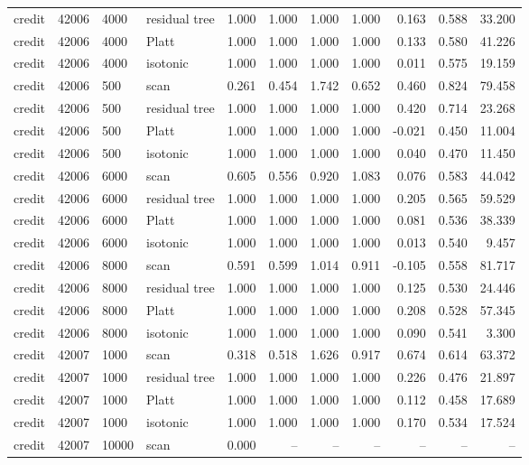 \begin{tabular}{lrllrrrrrrr}
credit & 42006 & 4000 & residual tree & 1.000 & 1.000 & 1.000 & 1.000 & 0.163 & 0.588 & 33.200 \\
credit & 42006 & 4000 & Platt & 1.000 & 1.000 & 1.000 & 1.000 & 0.133 & 0.580 & 41.226 \\
credit & 42006 & 4000 & isotonic & 1.000 & 1.000 & 1.000 & 1.000 & 0.011 & 0.575 & 19.159 \\
credit & 42006 & 500 & scan & 0.261 & 0.454 & 1.742 & 0.652 & 0.460 & 0.824 & 79.458 \\
credit & 42006 & 500 & residual tree & 1.000 & 1.000 & 1.000 & 1.000 & 0.420 & 0.714 & 23.268 \\
credit & 42006 & 500 & Platt & 1.000 & 1.000 & 1.000 & 1.000 & -0.021 & 0.450 & 11.004 \\
credit & 42006 & 500 & isotonic & 1.000 & 1.000 & 1.000 & 1.000 & 0.040 & 0.470 & 11.450 \\
credit & 42006 & 6000 & scan & 0.605 & 0.556 & 0.920 & 1.083 & 0.076 & 0.583 & 44.042 \\
credit & 42006 & 6000 & residual tree & 1.000 & 1.000 & 1.000 & 1.000 & 0.205 & 0.565 & 59.529 \\
credit & 42006 & 6000 & Platt & 1.000 & 1.000 & 1.000 & 1.000 & 0.081 & 0.536 & 38.339 \\
credit & 42006 & 6000 & isotonic & 1.000 & 1.000 & 1.000 & 1.000 & 0.013 & 0.540 & 9.457 \\
credit & 42006 & 8000 & scan & 0.591 & 0.599 & 1.014 & 0.911 & -0.105 & 0.558 & 81.717 \\
credit & 42006 & 8000 & residual tree & 1.000 & 1.000 & 1.000 & 1.000 & 0.125 & 0.530 & 24.446 \\
credit & 42006 & 8000 & Platt & 1.000 & 1.000 & 1.000 & 1.000 & 0.208 & 0.528 & 57.345 \\
credit & 42006 & 8000 & isotonic & 1.000 & 1.000 & 1.000 & 1.000 & 0.090 & 0.541 & 3.300 \\
credit & 42007 & 1000 & scan & 0.318 & 0.518 & 1.626 & 0.917 & 0.674 & 0.614 & 63.372 \\
credit & 42007 & 1000 & residual tree & 1.000 & 1.000 & 1.000 & 1.000 & 0.226 & 0.476 & 21.897 \\
credit & 42007 & 1000 & Platt & 1.000 & 1.000 & 1.000 & 1.000 & 0.112 & 0.458 & 17.689 \\
credit & 42007 & 1000 & isotonic & 1.000 & 1.000 & 1.000 & 1.000 & 0.170 & 0.534 & 17.524 \\
credit & 42007 & 10000 & scan & 0.000 & -- & -- & -- & -- & -- & -- \\

\end{tabular}
